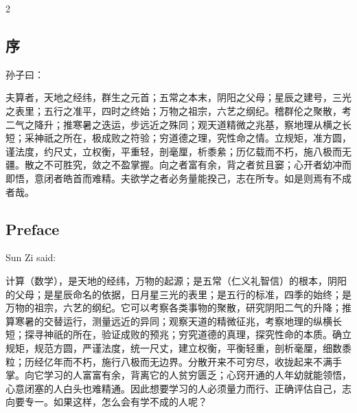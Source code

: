 \documentclass[11pt,a4paper]{article}
\begin{document}
\newpage

\begin{paracol}{2}

\begin{classicalbox}
\section*{序}

孙子曰：

夫算者，天地之经纬，群生之元首；五常之本末，阴阳之父母；星辰之建号，三光之表里；五行之准平，四时之终始；万物之祖宗，六艺之纲纪。稽群伦之聚散，考二气之降升；推寒暑之迭运，步远近之殊同；观天道精微之兆基，察地理从横之长短；采神祇之所在，极成败之符验；穷道德之理，究性命之情。立规矩，准方圆，谨法度，约尺丈，立权衡，平重轻，剖毫厘，析黍絫；历亿载而不朽，施八极而无疆。散之不可胜究，敛之不盈掌握。向之者富有余，背之者贫且窭；心开者幼冲而即悟，意闭者皓首而难精。夫欲学之者必务量能揆己，志在所专。如是则焉有不成者哉。
\end{classicalbox}

\switchcolumn

\begin{modernbox}
\section*{Preface}

Sun Zi said:

计算（数学），是天地的经纬，万物的起源；是五常（仁义礼智信）的根本，阴阳的父母；是星辰命名的依据，日月星三光的表里；是五行的标准，四季的始终；是万物的祖宗，六艺的纲纪。它可以考察各类事物的聚散，研究阴阳二气的升降；推算寒暑的交替运行，测量远近的异同；观察天道的精微征兆，考察地理的纵横长短；探寻神祇的所在，验证成败的预兆；穷究道德的真理，探究性命的本质。确立规矩，规范方圆，严谨法度，统一尺丈，建立权衡，平衡轻重，剖析毫厘，细数黍粒；历经亿年而不朽，施行八极而无边界。分散开来不可穷尽，收拢起来不满手掌。向它学习的人富富有余，背离它的人贫穷匮乏；心窍开通的人年幼就能领悟，心意闭塞的人白头也难精通。因此想要学习的人必须量力而行、正确评估自己，志向要专一。如果这样，怎么会有学不成的人呢？
\end{modernbox}

\end{paracol}

\newpage
\end{document}
